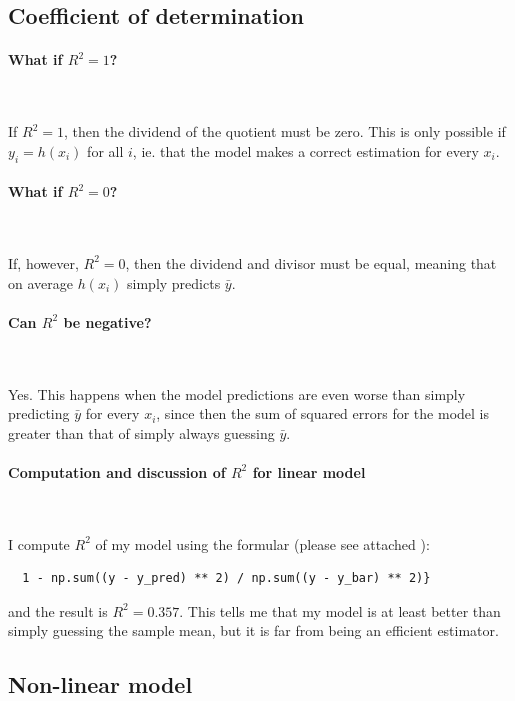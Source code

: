 \subsection{Coefficient of determination}

\paragraph{What if $R^2 = 1$?}~\smallskip

If $R^2 = 1$, then the dividend of the quotient must be zero. This is only
possible if $y_i = h(x_i)$ for all $i$, ie. that the model makes a correct
estimation for every $x_i$.

\paragraph{What if $R^2 = 0$?}~\smallskip

If, however, $R^2 = 0$, then the dividend and divisor must be equal, meaning that
on average $h(x_i)$ simply predicts $\bar y$.

\newpage
\paragraph{Can $R^2$ be negative?}~\smallskip

Yes. This happens when the model predictions are even worse than simply
predicting $\bar y$ for every $x_i$, since then the sum of squared errors for
the model is greater than that of simply always guessing $\bar y$.


\paragraph{Computation and discussion of $R^2$ for linear model}~\smallskip

I compute $R^2$ of my model using the formular (please see attached ):

\begin{verbatim}
  1 - np.sum((y - y_pred) ** 2) / np.sum((y - y_bar) ** 2)}
\end{verbatim}

and the result is $R^2 = 0.357$. This tells me that my model is at least better
than simply guessing the sample mean, but it is far from being an efficient
estimator.

\subsection{Non-linear model}

